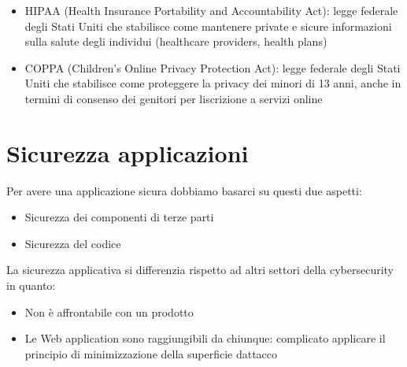 \documentclass[
]{article}
\providecommand{\tightlist}{%
  \setlength{\itemsep}{0pt}\setlength{\parskip}{0pt}}
\begin{document}
{}

\begin{itemize}
\tightlist
\item
  {HIPAA (Health Insurance Portability and Accountability Act)}{: legge
  federale degli Stati Uniti che stabilisce come mantenere private e
  sicure informazioni sulla salute degli individui (healthcare
  providers, health plans)}
\end{itemize}

{}

\begin{itemize}
\tightlist
\item
  {COPPA (Children's Online Privacy Protection Act)}{: legge federale
  degli Stati Uniti che stabilisce come proteggere la privacy dei minori
  di 13 anni, anche in termini di consenso dei genitori per
  l\textquotesingle iscrizione a servizi online}
\end{itemize}

{}

\section{\texorpdfstring{{Sicurezza
applicazioni}}{Sicurezza applicazioni}}\label{h.76wobnraswok}

{Per avere una applicazione sicura dobbiamo basarci su questi due
aspetti:}

\begin{itemize}
\tightlist
\item
  {Sicurezza dei componenti di terze parti}
\item
  {Sicurezza del codice}
\end{itemize}

{}

{La sicurezza applicativa si differenzia rispetto ad altri settori della
cybersecurity in quanto: }

\begin{itemize}
\tightlist
\item
  {Non è affrontabile con un prodotto }
\end{itemize}

{}

\begin{itemize}
\tightlist
\item
  {Le Web application sono raggiungibili da chiunque}{: complicato
  applicare il principio di minimizzazione della superficie
  d\textquotesingle attacco}
\end{itemize}
\end{document}

